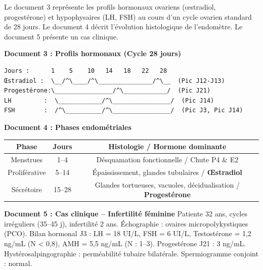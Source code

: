 \documentclass[11pt]{article}
\begin{document}
\begin{exercice}
Le document 3 représente les profils hormonaux ovariens (œstradiol, progestérone) et hypophysaires (LH, FSH) au cours d'un cycle ovarien standard de 28 jours. Le document 4 décrit l'évolution histologique de l'endomètre. Le document 5 présente un cas clinique.

\begin{center}
\textbf{Document 3 : Profils hormonaux (Cycle 28 jours)}
\begin{verbatim}
Jours :      1    5    10   14   18   22   28
Œstradiol :  \__/^\____/^\_______________/^\__  (Pic J12-J13)
Progestérone:\________________/^\____________/  (Pic J21)
LH         :  \____________/^\________________/  (Pic J14)
FSH        :  /^\__________/^\________________/  (Pic J3, Pic J14)
\end{verbatim}
\end{center}

\begin{center}
\textbf{Document 4 : Phases endométriales}
\begin{tabular}{|c|c|c|}
\hline
\textbf{Phase} & \textbf{Jours} & \textbf{Histologie / Hormone dominante} \\
\hline
Menstrues & 1--4 & Désquamation fonctionnelle / Chute P4 \& E2 \\
Proliférative & 5--14 & Épaississement, glandes tubulaires / \textbf{Œstradiol} \\
Sécrétoire & 15--28 & Glandes tortueuses, vacuoles, décidualisation / \textbf{Progestérone} \\
\hline
\end{tabular}
\end{center}

\begin{center}
\textbf{Document 5 : Cas clinique -- Infertilité féminine}
Patiente 32 ans, cycles irréguliers (35--45 j), infertilité 2 ans. Échographie : ovaires micropolykystiques (PCO). Bilan hormonal J3 : LH = 18 UI/L, FSH = 6 UI/L, Testostérone = 1,2 ng/mL (N < 0,8), AMH = 5,5 ng/mL (N : 1--3). Progestérone J21 : 3 ng/mL. Hystérosalpingographie : perméabilité tubaire bilatérale. Spermiogramme conjoint : normal.
\end{center}


\end{exercice}
\end{document}
